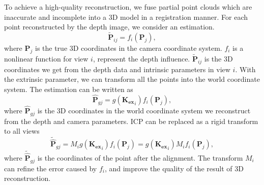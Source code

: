 {To achieve a high-quality reconstruction, we fuse partial point clouds which are inaccurate and incomplete into a 3D model in a registration manner.
%
For each point reconstructed by the depth image, we consider an estimation.
\begin{equation}
\mathbf{\tilde{P}}_{ij}=f_{i}(\mathbf{P}_{j}),
\end{equation}
where $\mathbf{P}_{j}$ is the true 3D coordinates in the camera coordinate system. $f_{i}$ is a nonlinear function for view $i$, represent the depth influence. $\mathbf{\tilde{P}}_{ij}$ is the 3D coordinates we get from the depth data and intrinsic parameters in view $i$. With the extrinsic parameter, we can transform all the points into the world coordinate system. The estimation can be written as
\begin{equation}
\mathbf{\hat{P}}_{gj}=g(\mathbf{K_{ex}}_{i})f_{i}(\mathbf{P}_{j}),
\end{equation}
where $\mathbf{\hat{P}}_{gj}$ is the 3D coordinates in the world coordinate system we reconstruct from the depth and camera parameters. ICP can be replaced as a rigid transform to all views
\begin{equation}
\mathbf{\tilde{\hat{P}}}_{gj}=M_{i}g(\mathbf{K_{ex}}_{i})f_{i}(\mathbf{P}_{j})=g(\mathbf{K_{ex}}_{i})M_{i}f_{i}(\mathbf{P}_{j}),
\end{equation}
where $\mathbf{\tilde{\hat{P}}}_{gj}$ is the coordinates of the point after the alignment. The transform $M_{i}$ can refine the error caused by $f_{i}$, and improve the quality of the result of 3D reconstruction.
}%



